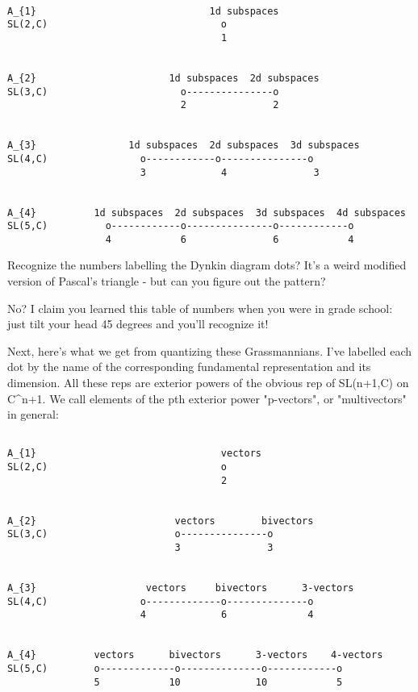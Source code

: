 \begin{verbatim}

A_{1}                              1d subspaces
SL(2,C)                              o
                                     1


A_{2}                       1d subspaces  2d subspaces
SL(3,C)                       o---------------o
                              2               2


A_{3}                1d subspaces  2d subspaces  3d subspaces
SL(4,C)                o------------o---------------o
                       3             4               3


A_{4}          1d subspaces  2d subspaces  3d subspaces  4d subspaces
SL(5,C)          o------------o---------------o------------o
                 4            6               6            4
\end{verbatim}
    
Recognize the numbers labelling the Dynkin diagram dots?  It's a weird
modified version of Pascal's triangle - but can you figure out the pattern?

No?  I claim you learned this table of numbers when you were in grade
school: just tilt your head 45 degrees and you'll recognize it!

Next, here's what we get from quantizing these Grassmannians.  I've
labelled each dot by the name of the corresponding fundamental
representation and its dimension.  All these reps are exterior powers 
of the obvious rep of SL(n+1,C) on C^{n+1}.  We call elements of the pth
exterior power "p-vectors", or "multivectors" in general:


\begin{verbatim}

A_{1}                                vectors 
SL(2,C)                              o
                                     2


A_{2}                        vectors        bivectors
SL(3,C)                      o---------------o
                             3               3


A_{3}                   vectors     bivectors      3-vectors
SL(4,C)                o-------------o--------------o
                       4             6              4


A_{4}          vectors      bivectors      3-vectors    4-vectors
SL(5,C)        o-------------o--------------o------------o
               5            10             10            5
\end{verbatim}
    
